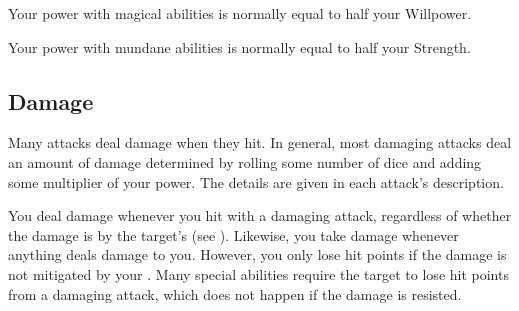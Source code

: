         Your power with magical abilities is normally equal to half your Willpower.

        Your power with mundane abilities is normally equal to half your Strength.

    \subsection{Damage}\label{Damage}
        Many attacks deal damage when they hit.
        In general, most damaging attacks deal an amount of damage determined by rolling some number of dice and adding some multiplier of your power.
        The details are given in each attack's description.

        You deal damage whenever you hit with a damaging attack, regardless of whether the damage is  by the target's  (see ).
        Likewise, you take damage whenever anything deals damage to you.
        However, you only lose hit points if the damage is not mitigated by your .
        Many special abilities require the target to lose hit points from a damaging attack, which does not happen if the damage is resisted.

